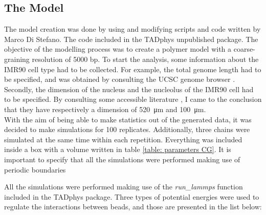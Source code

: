 
\subsection{The Model} \label{chap: the model description}
The model creation was done by using and modifying scripts and code written by Marco Di Stefano. The code included in the TADphys unpublished package.
The objective of the modelling process was to create a polymer model with a coarse-graining resolution of 5000 bp. To start the analysis, some information about the IMR90 cell type had to be collected. For example, the total genome length had to be specified, and was obtained by consulting the UCSC genome browser
\cite{UCSCGenomeBrowser}.
Secondly, the dimension of the nucleus and the nucleolus of the IMR90 cell had to be specified. By consulting some accessible literature
\cite{ehlerHumanFoetalLung1996,ingramHiCImplementationGenome2020,maiserSuperresolutionSituAnalysis2020},
I came to the conclusion that they have respectively a dimension of \SI{520}{\micro\metre} and \SI{100}{\micro\metre}.\\

With the aim of being able to make statistics out of the generated data, it was decided to make simulations for 100 replicates. Additionally, three chains were simulated at the same time within each repetition. Everything was included inside a box with a volume written in table \ref{table: parameters CG}. 
It is important to specify that all the simulations were performed making use of periodic boundaries %

All the simulations were performed making use of the \textit{run\_lammps} function included in the TADphys package.
Three types of potential energies were used to regulate the interactions between beads, and those are presented in the list below:

